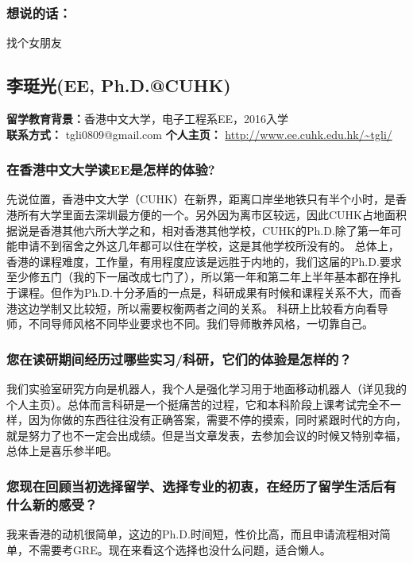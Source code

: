 \documentclass[a4paper,UTF8]{book}
\begin{document}
    \subsubsection{想说的话：}
    找个女朋友
        
\clearpage
\subsection{李珽光(EE, Ph.D.@CUHK)}
    \textbf{留学教育背景：}香港中文大学，电子工程系EE，2016入学\\
    \textbf{联系方式：} tgli0809@gmail.com
    \textbf{个人主页：} \url{http://www.ee.cuhk.edu.hk/~tgli/}

    \subsubsection*{在香港中文大学读EE是怎样的体验?}
    先说位置，香港中文大学（CUHK）在新界，距离口岸坐地铁只有半个小时，是香港所有大学里面去深圳最方便的一个。另外因为离市区较远，因此CUHK占地面积据说是香港其他六所大学之和，相对香港其他学校，CUHK的Ph.D.除了第一年可能申请不到宿舍之外这几年都可以住在学校，这是其他学校所没有的。
    总体上，香港的课程难度，工作量，有用程度应该是远胜于内地的，我们这届的Ph.D.要求至少修五门（我的下一届改成七门了），所以第一年和第二年上半年基本都在挣扎于课程。但作为Ph.D.十分矛盾的一点是，科研成果有时候和课程关系不大，而香港这边学制又比较短，所以需要权衡两者之间的关系。
    科研上比较看方向看导师，不同导师风格不同毕业要求也不同。我们导师散养风格，一切靠自己。
    \subsubsection*{您在读研期间经历过哪些实习/科研，它们的体验是怎样的？}
    我们实验室研究方向是机器人，我个人是强化学习用于地面移动机器人（详见我的个人主页）。总体而言科研是一个挺痛苦的过程，它和本科阶段上课考试完全不一样，因为你做的东西往往没有正确答案，需要不停的摸索，同时紧跟时代的方向，就是努力了也不一定会出成绩。但是当文章发表，去参加会议的时候又特别幸福，总体上是喜乐参半吧。
    \subsubsection*{您现在回顾当初选择留学、选择专业的初衷，在经历了留学生活后有什么新的感受？}
    我来香港的动机很简单，这边的Ph.D.时间短，性价比高，而且申请流程相对简单，不需要考GRE。现在来看这个选择也没什么问题，适合懒人。
\end{document}
